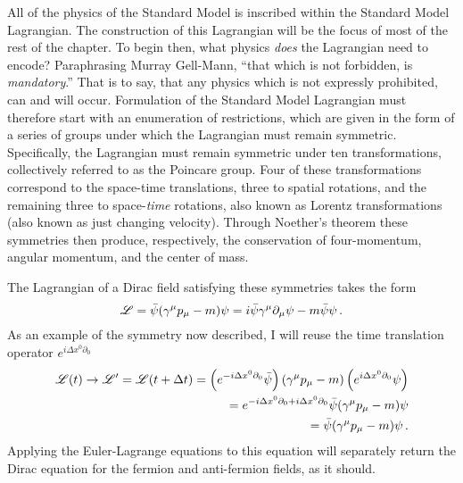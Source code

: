     All of the physics of the Standard Model is inscribed within the Standard Model Lagrangian.
    The construction of this Lagrangian will be the focus of most of the rest of the chapter.
    To begin then, what physics \textit{does} the Lagrangian need to encode?
    Paraphrasing Murray Gell-Mann, ``that which is not forbidden, is \textit{mandatory}\cite{Gell-Mann_mandatory}.''
    That is to say, that any physics which is not expressly prohibited, can and will occur.
    Formulation of the Standard Model Lagrangian must therefore start with an enumeration of restrictions,
        which are given in the form of a series of groups under which the Lagrangian must remain symmetric.
    Specifically, the Lagrangian must remain symmetric under ten transformations,
        collectively referred to as the Poincare group.
    Four of these transformations correspond to the space-time translations,
        three to spatial rotations, and the remaining three to space-\textit{time} rotations,
        also known as Lorentz transformations (also known as just changing velocity).
    Through Noether's theorem these symmetries then produce, respectively,
        the conservation of four-momentum, angular momentum, and the center of mass.

    The Lagrangian of a Dirac field satisfying these symmetries takes the form
    \begin{equation} \label{eq:basic_fermionL}
        \mathscr{L} = \bar{\psi} (\gamma^\mu p_\mu - m) \psi = i \bar{\psi} \gamma^\mu \partial_\mu \psi - m \bar{\psi} \psi
        \,.
    \end{equation}
    As an example of the symmetry now described, I will reuse the time translation operator $e^{i\Delta x^0 \partial_0}$
    \begin{equation} \begin{split}
        \mathscr{L}(t) \to \mathscr{L}' = \mathscr{L}(t+\Delta t) =
            \left( e^{-i\Delta x^0 \partial_0} \bar{\psi} \right) (\gamma^\mu p_\mu - m) \left( e^{i\Delta x^0 \partial_0}\psi \right)
        \\  = e^{-i\Delta x^0 \partial_0 + i \Delta x^0 \partial_0} \bar{\psi} (\gamma^\mu p_\mu - m) \psi
        \\  = \bar{\psi} (\gamma^\mu p_\mu - m) \psi
        \,.
    \end{split} \end{equation}
    Applying the Euler-Lagrange equations to this equation will separately return the Dirac equation
        for the fermion and anti-fermion fields, as it should.

